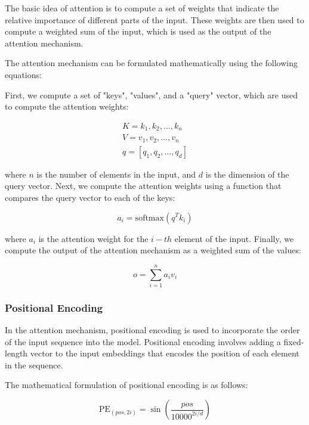 The basic idea of attention is to compute a set of weights that indicate the relative importance of different parts of the input. These weights are then used to compute a weighted sum of the input, which is used as the output of the attention mechanism.

The attention mechanism can be formulated mathematically using the following equations:

First, we compute a set of "keys", "values", and a "query" vector, which are used to compute the attention weights:

\begin{equation}
\begin{split}
	K = {k_1, k_2, ..., k_n} \\
	V = {v_1, v_2, ..., v_n} \\
	q = [q_1, q_2, ..., q_d]
\end{split}
\end{equation}

where $n$ is the number of elements in the input, and $d$ is the dimension of the query vector. Next, we compute the attention weights using a function that compares the query vector to each of the keys:

\begin{equation}
	a_i = \text{softmax}(q^T k_i)
\end{equation}

where $a_i$ is the attention weight for the $i-th$ element of the input. Finally, we compute the output of the attention mechanism as a weighted sum of the values:

\begin{equation}
	o = \sum_{i=1}^{n} a_i v_i
\end{equation}

\subsubsection{Positional Encoding}
\label{subsubsec:3_positional_encoding}

In the attention mechanism, positional encoding is used to incorporate the order of the input sequence into the model. Positional encoding involves adding a fixed-length vector to the input embeddings that encodes the position of each element in the sequence.

The mathematical formulation of positional encoding is as follows:

\begin{equation}
	\text{PE}_{(pos,2i)} = \sin\left(\frac{pos}{10000^{2i/d}}\right)
\end{equation}

